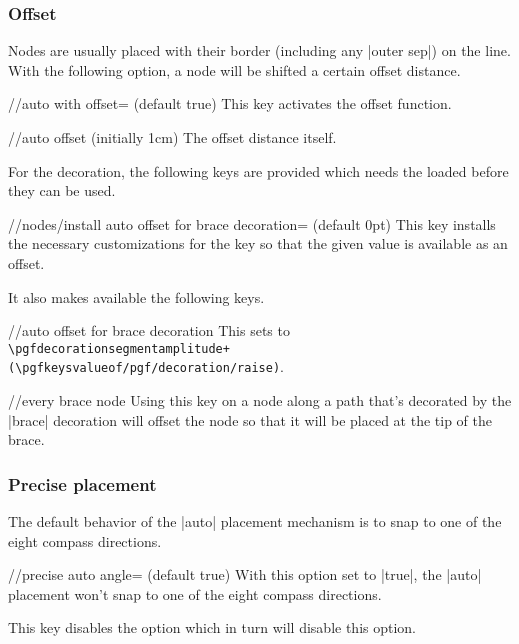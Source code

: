 \begin{multicols}{2}
\subsubsection{Offset}
Nodes are usually placed with their border (including any |outer sep|)
on the line.
With the following option, a node will be shifted a certain offset distance.

\begin{key}{/\tikzext/auto with offset= (default true)}
  This key activates the offset function.
\end{key}
\begin{key}{/\tikzext/auto offset (initially 1cm)}
The offset distance itself.
\end{key}

For the  decoration,
the following keys are provided which needs the
 loaded before they
can be used.
\begin{key}{/\tikzext/nodes/install auto offset for brace decoration= (default 0pt)}
This key installs the necessary customizations
for the  key
so that the given value is available as an offset.

It also makes available the following keys.
\begin{stylekey}{/\tikzext/auto offset for brace decoration}
This sets  to
\texttt{\textbackslash pgfdecorationsegmentamplitude+
  (\textbackslash pgfkeysvalueof{/pgf/decoration/raise})}.
\end{stylekey}
\begin{stylekey}{/\tikzext/every brace node}
Using this key on a node along a path that's decorated by the |brace| decoration
will offset the node so that it will be placed at the tip of the brace.
\end{stylekey}
\end{key}

\subsubsection{Precise placement}
The default behavior of the |auto| placement mechanism is
to snap to one of the eight compass directions.
\begin{key}{/\tikzext/precise auto angle= (default true)}
With this option set to |true|, the |auto| placement won't snap
to one of the eight compass directions.

This key disables the  option
which in turn will disable this option.
\end{key}
\end{multicols}